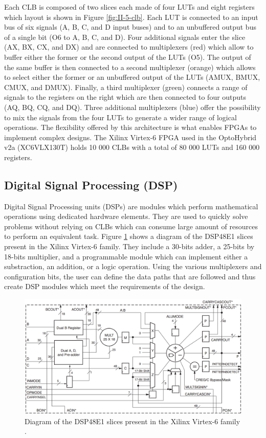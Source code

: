       Each CLB is composed of two slices each made of four LUTs and eight registers which layout is shown in Figure \ref{fig:II-5-clb}. Each LUT is connected to an input bus of six signals (A, B, C, and D input buses) and to an unbuffered output bus of a single bit (O6 to A, B, C, and D). Four additional signals enter the slice (AX, BX, CX, and DX) and are connected to multiplexers (red) which allow to buffer either the former or the second output of the LUTs (O5). The output of the same buffer is then connected to a second multiplexer (orange) which allows to select either the former or an unbuffered output of the LUTs (AMUX, BMUX, CMUX, and DMUX). Finally, a third multiplexer (green) connects a range of signals to the registers on the right which are then connected to four outputs (AQ, BQ, CQ, and DQ). Three additional multiplexers (blue) offer the possibility to mix the signals from the four LUTs to generate a wider range of logical operations. The flexibility offered by this architecture is what enables FPGAs to implement complex designs. The Xilinx Virtex-6 FPGA used in the OptoHybrid v2a (XC6VLX130T) holds 10 000 CLBs with a total of 80 000 LUTs and 160 000 registers.

    \subsection{Digital Signal Processing (DSP)}

      Digital Signal Processing units (DSPs) \cite{VIRTEX-DSP} are modules which perform mathematical operations using dedicated hardware elements. They are used to quickly solve problems without relying on CLBs which can consume large amount of resources to perform an equivalent task. Figure \ref{fig:II-5-dsp} shows a diagram of the DSP48E1 slices present in the Xilinx Virtex-6 family. They include a 30-bits adder, a 25-bits by 18-bits multiplier, and a programmable module which can implement either a substraction, an addition, or a logic operation. Using the various multiplexers and configuration bits, the user can define the data paths that are followed and thus create DSP modules which meet the requirements of the design.

      \begin{figure}[b!]
        \centering
        \includegraphics[width=\textwidth]{img/II-5-irradiation/dsp.png}
        \caption{Diagram of the DSP48E1 slices present in the Xilinx Virtex-6 family \cite{VIRTEX-DSP}.}
        \label{fig:II-5-dsp}
      \end{figure}

